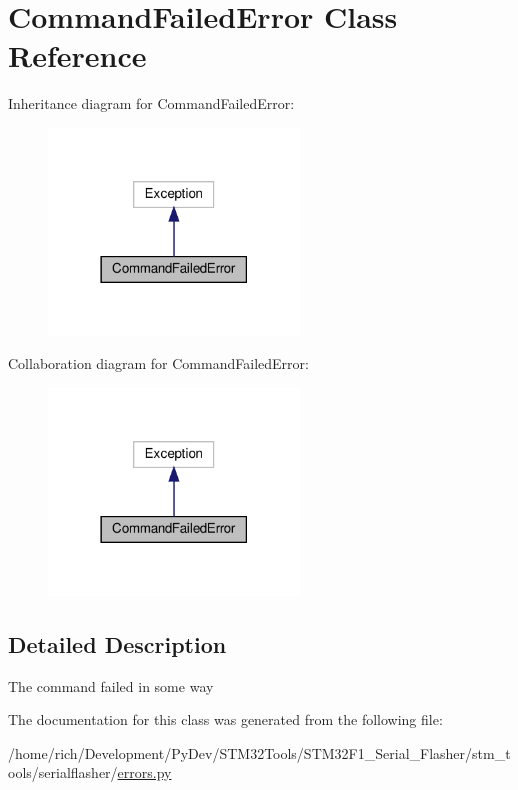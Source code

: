 \hypertarget{classstm__tools_1_1serialflasher_1_1errors_1_1CommandFailedError}{}\section{Command\+Failed\+Error Class Reference}
\label{classstm__tools_1_1serialflasher_1_1errors_1_1CommandFailedError}


Inheritance diagram for Command\+Failed\+Error\+:
\nopagebreak
\begin{figure}[H]
\begin{center}
\leavevmode
\includegraphics[width=189pt]{classstm__tools_1_1serialflasher_1_1errors_1_1CommandFailedError__inherit__graph}
\end{center}
\end{figure}


Collaboration diagram for Command\+Failed\+Error\+:
\nopagebreak
\begin{figure}[H]
\begin{center}
\leavevmode
\includegraphics[width=189pt]{classstm__tools_1_1serialflasher_1_1errors_1_1CommandFailedError__coll__graph}
\end{center}
\end{figure}


\subsection{Detailed Description}
\begin{DoxyVerb}The command failed in some way\end{DoxyVerb}
 

The documentation for this class was generated from the following file\+:\begin{DoxyCompactItemize}
\item 
/home/rich/\+Development/\+Py\+Dev/\+S\+T\+M32\+Tools/\+S\+T\+M32\+F1\+\_\+\+Serial\+\_\+\+Flasher/stm\+\_\+tools/serialflasher/\hyperlink{errors_8py}{errors.\+py}\end{DoxyCompactItemize}
